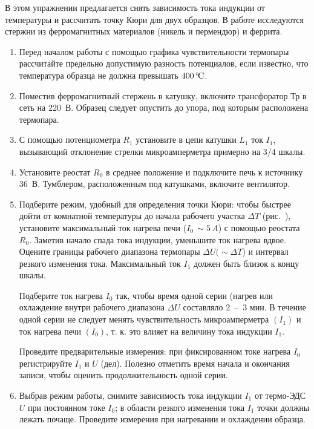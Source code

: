 \begin{lab:task}

В этом упражнении предлагается снять зависимость тока индукции от температуры и
рассчитать точку Кюри для двух образцов. В работе исследуются стержни из
ферромагнитных материалов (никель и пермендюр) и феррита.

\begin{enumerate}
\item
  \label{item:1}
  Перед началом работы с помощью графика чувствительности термопары рассчитайте
предельно допустимую разность потенциалов, если известно, что температура
образца не должна превышать $400\,^\circ\!\mathrm{C}$.
\item
  Поместив ферромагнитный стержень в катушку, включите трансфоратор $\text{Тр}$
в сеть на 220~В. Образец следует опустить до упора, под которым расположена
термопара.
\item
  С помощью потенциометра $R_1$ установите в цепи катушки $L_1$ ток $I_1$,
вызывающий отклонение стрелки микроамперметра примерно на $3/4$ шкалы.
\item
  Установите реостат $R_0$ в среднее положение и подключите печь к ис­точнику
36~В. Тумблером, расположенным под катушками, включите вентилятор.
\item
  Подберите режим, удобный для определения точки Кюри: чтобы быстрее дойти от
комнатной температуры до начала рабочего участка $\Delta T$
(рис.~), установите максимальный
ток нагрева печи ($I_0\,\sim5\,A$) с помощью реостата $R_0$. Заметив начало
спада тока индукции, уменьшите ток нагрева вдвое. Оцените границы рабочего
диапазона термопары $\Delta U ( \sim\Delta T$) и интервал резкого изменения
тока. Максимальный ток $I_1$ должен быть близок к концу шкалы.


Подберите ток нагрева $I_0$ так, чтобы время одной серии (нагрев или охлаждение
внутри рабочего диапазона $\Delta U$ составляло 2~--~3 мин. В течение одной
серии не следует менять чувствительность микроамперметра $(I_1)$ и ток нагрева
печи $(I_0)$, т. к. это влияет на величину тока индукции $I_1$.

Проведите предварительные измерения: при фиксированном токе нагрева $I_0$
регистрируйте $I_1$ и $U$ (дел). Полезно отметить время начала и окончания
записи, чтобы оценить продолжительность одной серии.


\item
  Выбрав режим работы, снимите зависимость тока индукции $I_1$ от термо-ЭДС $U$
при постоянном токе $I_0$; в
  области резкого изменения тока $I_1$ точки должны лежать почаще. Проведите
измерения при нагревании и охлаждении образца.


\end{enumerate}
\end{lab:task}

